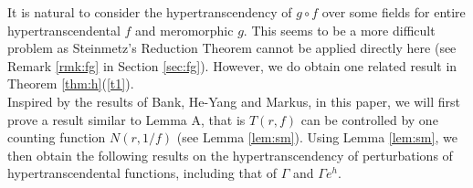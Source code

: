 \documentclass[reqno,12pt]{amsart}
\begin{document}

It is natural to consider the hypertranscendency of $g\circ f$ over some fields for entire hypertranscendental $f$ and meromorphic $g$. This seems to be a more difficult problem as  Steinmetz's Reduction Theorem cannot be applied directly here (see Remark \ref{rmk:fg} in Section \ref{sec:fg}). However, we do obtain one related result in Theorem \ref{thm:h}(\ref{t1}).\\



 Inspired by the results of Bank, He-Yang and Markus,  in this paper, we will first prove a result similar to Lemma A,  that is  $T(r, f)$ can be controlled by one counting function 
$N(r, 1/f)$ (see Lemma \ref{lem:sm}). Using Lemma \ref{lem:sm}, we then  obtain the following results on the hypertranscendency of perturbations of hypertranscendental functions, including that of $\Gamma$ and $\Gamma e^h$.   
 
\end{document}
